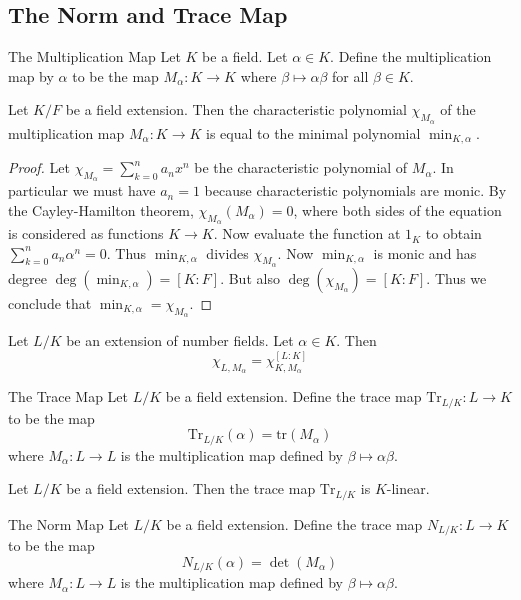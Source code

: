 \documentclass[a4paper]{article}
\begin{document}
\subsection{The Norm and Trace Map}
\begin{defn}{The Multiplication Map}{} Let $K$ be a field. Let $\alpha\in K$. Define the multiplication map by $\alpha$ to be the map $M_\alpha:K\to K$ where $\beta\mapsto\alpha\beta$ for all $\beta\in K$. 
\end{defn}

\begin{prp}{}{} Let $K/F$ be a field extension. Then the characteristic polynomial $\chi_{M_\alpha}$ of the multiplication map $M_\alpha:K\to K$ is equal to the minimal polynomial $\min_{K,\alpha}$. \tcbline
\begin{proof}
Let $\chi_{M_\alpha}=\sum_{k=0}^na_nx^n$ be the characteristic polynomial of $M_\alpha$. In particular we must have $a_n=1$ because characteristic polynomials are monic. By the Cayley-Hamilton theorem, $\chi_{M_\alpha}(M_\alpha)=0$, where both sides of the equation is considered as functions $K\to K$. Now evaluate the function at $1_K$ to obtain $\sum_{k=0}^na_n\alpha^n=0$. Thus $\min_{K,\alpha}$ divides $\chi_{M_\alpha}$. Now $\min_{K,\alpha}$ is monic and has degree $\deg(\min_{K,\alpha})=[K:F]$. But also $\deg(\chi_{M_\alpha})=[K:F]$. Thus we conclude that $\min_{K,\alpha}=\chi_{M_\alpha}$. 
\end{proof}
\end{prp}

\begin{prp}{}{} Let $L/K$ be an extension of number fields. Let $\alpha\in K$. Then $$\chi_{L,M_\alpha}=\chi_{K,M_\alpha}^{[L:K]}$$
\end{prp}

\begin{defn}{The Trace Map}{} Let $L/K$ be a field extension. Define the trace map $\text{Tr}_{L/K}:L\to K$ to be the map $$\text{Tr}_{L/K}(\alpha)=\text{tr}(M_\alpha)$$ where $M_\alpha:L\to L$ is the multiplication map defined by $\beta\mapsto\alpha\beta$. 
\end{defn}

\begin{lmm}{}{} Let $L/K$ be a field extension. Then the trace map $\text{Tr}_{L/K}$ is $K$-linear. 
\end{lmm}

\begin{defn}{The Norm Map}{} Let $L/K$ be a field extension. Define the trace map $N_{L/K}:L\to K$ to be the map $$N_{L/K}(\alpha)=\det(M_\alpha)$$ where $M_\alpha:L\to L$ is the multiplication map defined by $\beta\mapsto\alpha\beta$. 
\end{defn}
\end{document}
